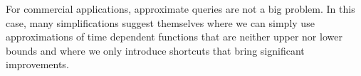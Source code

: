 \documentclass[12pt]{article}
\begin{document}
For commercial applications, approximate queries are not a big problem.
In this case, many simplifications suggest themselves where we 
can simply use approximations of time dependent functions
that are neither upper nor lower bounds and where we only introduce
shortcuts that bring significant improvements. 





\end{document}
